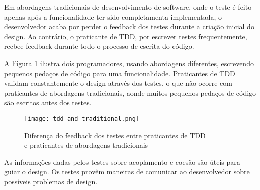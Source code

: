 Em abordagens tradicionais de desenvolvimento de software, onde o teste é feito
apenas após a funcionalidade ter sido completamenta implementada, o
desenvolvedor acaba por perder o feedback dos testes durante a criação inicial
do design. Ao contrário, o praticante de TDD, por escrever testes
frequentemente, recbee feedback durante todo o processo de escrita do código.

A Figura \ref{fig:tdd-feedback} ilustra dois programadores, usando
abordagens diferentes, escrevendo pequenos pedaços de código para uma
funcionalidade. Praticantes de TDD validam constantemente o design através dos
testes, o que não ocorre com praticantes de abordagens tradicionais, aonde
muitos pequenos pedaços de código são escritos antes dos testes.

\begin{figure}[h!H]
  \centering
  \texttt{[image: tdd-and-traditional.png]}
  \caption{Diferença do feedback dos testes entre praticantes de TDD 
  \\e praticantes de abordagens tradicionais}
  \label{fig:tdd-feedback}
\end{figure}

As informações dadas pelos testes sobre acoplamento e coesão são úteis para
guiar o design. Os testes provêm maneiras de comunicar ao desenvolvedor sobre
possíveis problemas de design. 
